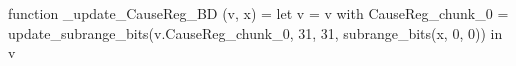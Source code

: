 function _update_CauseReg_BD (v, x) = let v = { v with CauseReg_chunk_0 = update_subrange_bits(v.CauseReg_chunk_0, 31, 31, subrange_bits(x, 0, 0)) } in
  v
